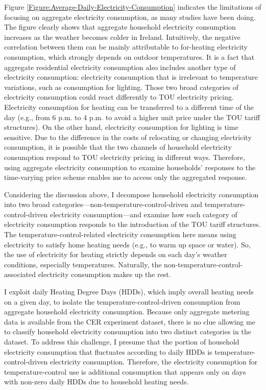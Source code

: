 Figure \ref{Figure:Average-Daily-Electricity-Consumption} indicates the limitations of focusing on aggregate electricity consumption, as many studies have been doing. The figure clearly shows that aggregate household electricity consumption increases as the weather becomes colder in Ireland. Intuitively, the negative correlation between them can be mainly attributable to for-heating electricity consumption, which strongly depends on outdoor temperatures. It is a fact that aggregate residential electricity consumption also includes another type of electricity consumption: electricity consumption that is irrelevant to temperature variations, such as consumption for lighting. Those two broad categories of electricity consumption could react differently to TOU electricity pricing. Electricity consumption for heating can be transferred to a different time of the day (e.g., from 6 p.m. to 4 p.m. to avoid a higher unit price under the TOU tariff structures). On the other hand, electricity consumption for lighting is time sensitive. Due to the difference in the costs of relocating or changing electricity consumption, it is possible that the two channels of household electricity consumption respond to TOU electricity pricing in different ways. Therefore, using aggregate electricity consumption to examine households' responses to the time-varying price scheme enables me to access only the aggregated response. 

Considering the discussion above, I decompose household electricity consumption into two broad categories---non-temperature-control-driven and temperature-control-driven electricity consumption---and examine how each category of electricity consumption responds to the introduction of the TOU tariff structures. The temperature-control-related electricity consumption here means using electricity to satisfy home heating needs (e.g., to warm up space or water). So, the use of electricity for heating strictly depends on each day's weather conditions, especially temperatures. Naturally, the non-temperature-control-associated electricity consumption makes up the rest. 

I exploit daily Heating Degree Days (HDDs), which imply overall heating needs on a given day, to isolate the temperature-control-driven consumption from aggregate household electricity consumption. Because only aggregate metering data is available from the CER experiment dataset, there is no clue allowing me to classify household electricity consumption into two distinct categories in the dataset. To address this challenge, I presume that the portion of household electricity consumption that fluctuates according to daily HDDs is temperature-control-driven electricity consumption. Therefore, the electricity consumption for temperature-control use is additional consumption that appears only on days with non-zero daily HDDs due to household heating needs.

